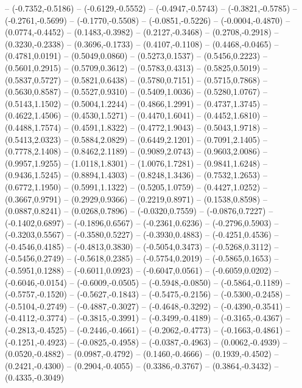 {	-- (-0.7352,-0.5186)
	-- (-0.6129,-0.5552)
	-- (-0.4947,-0.5743)
	-- (-0.3821,-0.5785)
	-- (-0.2761,-0.5699)
	-- (-0.1770,-0.5508)
	-- (-0.0851,-0.5226)
	-- (-0.0004,-0.4870)
	-- (0.0774,-0.4452)
	-- (0.1483,-0.3982)
	-- (0.2127,-0.3468)
	-- (0.2708,-0.2918)
	-- (0.3230,-0.2338)
	-- (0.3696,-0.1733)
	-- (0.4107,-0.1108)
	-- (0.4468,-0.0465)
	-- (0.4781,0.0191)
	-- (0.5049,0.0860)
	-- (0.5273,0.1537)
	-- (0.5456,0.2223)
	-- (0.5601,0.2915)
	-- (0.5709,0.3612)
	-- (0.5783,0.4313)
	-- (0.5825,0.5019)
	-- (0.5837,0.5727)
	-- (0.5821,0.6438)
	-- (0.5780,0.7151)
	-- (0.5715,0.7868)
	-- (0.5630,0.8587)
	-- (0.5527,0.9310)
	-- (0.5409,1.0036)
	-- (0.5280,1.0767)
	-- (0.5143,1.1502)
	-- (0.5004,1.2244)
	-- (0.4866,1.2991)
	-- (0.4737,1.3745)
	-- (0.4622,1.4506)
	-- (0.4530,1.5271)
	-- (0.4470,1.6041)
	-- (0.4452,1.6810)
	-- (0.4488,1.7574)
	-- (0.4591,1.8322)
	-- (0.4772,1.9043)
	-- (0.5043,1.9718)
	-- (0.5413,2.0323)
	-- (0.5884,2.0829)
	-- (0.6449,2.1201)
	-- (0.7091,2.1405)
	-- (0.7778,2.1408)
	-- (0.8462,2.1189)
	-- (0.9089,2.0743)
	-- (0.9603,2.0086)
	-- (0.9957,1.9255)
	-- (1.0118,1.8301)
	-- (1.0076,1.7281)
	-- (0.9841,1.6248)
	-- (0.9436,1.5245)
	-- (0.8894,1.4303)
	-- (0.8248,1.3436)
	-- (0.7532,1.2653)
	-- (0.6772,1.1950)
	-- (0.5991,1.1322)
	-- (0.5205,1.0759)
	-- (0.4427,1.0252)
	-- (0.3667,0.9791)
	-- (0.2929,0.9366)
	-- (0.2219,0.8971)
	-- (0.1538,0.8598)
	-- (0.0887,0.8241)
	-- (0.0268,0.7896)
	-- (-0.0320,0.7559)
	-- (-0.0876,0.7227)
	-- (-0.1402,0.6897)
	-- (-0.1896,0.6567)
	-- (-0.2361,0.6236)
	-- (-0.2796,0.5903)
	-- (-0.3203,0.5567)
	-- (-0.3580,0.5227)
	-- (-0.3930,0.4883)
	-- (-0.4251,0.4536)
	-- (-0.4546,0.4185)
	-- (-0.4813,0.3830)
	-- (-0.5054,0.3473)
	-- (-0.5268,0.3112)
	-- (-0.5456,0.2749)
	-- (-0.5618,0.2385)
	-- (-0.5754,0.2019)
	-- (-0.5865,0.1653)
	-- (-0.5951,0.1288)
	-- (-0.6011,0.0923)
	-- (-0.6047,0.0561)
	-- (-0.6059,0.0202)
	-- (-0.6046,-0.0154)
	-- (-0.6009,-0.0505)
	-- (-0.5948,-0.0850)
	-- (-0.5864,-0.1189)
	-- (-0.5757,-0.1520)
	-- (-0.5627,-0.1843)
	-- (-0.5475,-0.2156)
	-- (-0.5300,-0.2458)
	-- (-0.5104,-0.2749)
	-- (-0.4887,-0.3027)
	-- (-0.4648,-0.3292)
	-- (-0.4390,-0.3541)
	-- (-0.4112,-0.3774)
	-- (-0.3815,-0.3991)
	-- (-0.3499,-0.4189)
	-- (-0.3165,-0.4367)
	-- (-0.2813,-0.4525)
	-- (-0.2446,-0.4661)
	-- (-0.2062,-0.4773)
	-- (-0.1663,-0.4861)
	-- (-0.1251,-0.4923)
	-- (-0.0825,-0.4958)
	-- (-0.0387,-0.4963)
	-- (0.0062,-0.4939)
	-- (0.0520,-0.4882)
	-- (0.0987,-0.4792)
	-- (0.1460,-0.4666)
	-- (0.1939,-0.4502)
	-- (0.2421,-0.4300)
	-- (0.2904,-0.4055)
	-- (0.3386,-0.3767)
	-- (0.3864,-0.3432)
	-- (0.4335,-0.3049)
}
